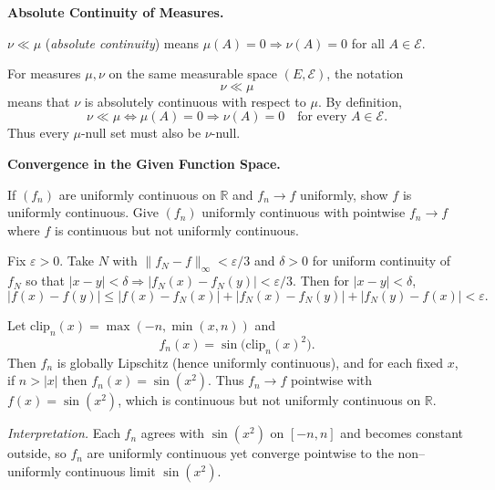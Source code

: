 \begin{problem}[CP-II-0558]
\label{prob:cp-ii-0558}
\textbf{Absolute Continuity of Measures.}

\hspace*{1.5em}$\nu\ll\mu$ (\emph{absolute continuity}) means $\mu(A)=0\Rightarrow \nu(A)=0$ for all $A\in\mathcal E$.
\end{problem}

\begin{solution}
For measures \(\mu,\nu\) on the same measurable space \((E,\mathcal E)\),
the notation
\[
\nu\ll\mu
\]
means that \(\nu\) is absolutely continuous with respect to \(\mu\). By definition,
\[
\boxed{
\nu\ll\mu
\iff
\mu(A)=0
\Longrightarrow
\nu(A)=0
\quad
\text{for every }A\in\mathcal E.
}
\]
Thus every \(\mu\)-null set must also be \(\nu\)-null.
\end{solution}


\begin{problem}[CP-II-0560]
\label{prob:cp-ii-0560}
\textbf{Convergence in the Given Function Space.}

\hspace*{1.5em}If $(f_n)$ are uniformly continuous on $\mathbb R$ and $f_n\to f$ uniformly, show $f$ is uniformly continuous.
Give $(f_n)$ uniformly continuous with pointwise $f_n\to f$ where $f$ is continuous but not uniformly continuous.

Fix $\varepsilon>0$. Take $N$ with $\|f_N-f\|_\infty<\varepsilon/3$ and $\delta>0$ for uniform continuity of $f_N$
so that $|x-y|<\delta\Rightarrow |f_N(x)-f_N(y)|<\varepsilon/3$.
Then for $|x-y|<\delta$,
\[
|f(x)-f(y)|\le |f(x)-f_N(x)|+|f_N(x)-f_N(y)|+|f_N(y)-f(x)|<\varepsilon.
\]

Let $\mathrm{clip}_n(x)=\max(-n,\min(x,n))$ and
\[
f_n(x)=\sin\!\big(\mathrm{clip}_n(x)^2\big).
\]
Then $f_n$ is globally Lipschitz (hence uniformly continuous), and for each fixed $x$, if $n>|x|$ then $f_n(x)=\sin(x^2)$.
Thus $f_n\to f$ pointwise with $f(x)=\sin(x^2)$, which is continuous but not uniformly continuous on $\mathbb R$.

\noindent
\textit{Interpretation.}
Each $f_n$ agrees with $\sin(x^2)$ on $[-n,n]$ and becomes constant outside, so $f_n$ are uniformly continuous
yet converge pointwise to the non--uniformly continuous limit $\sin(x^2)$.

\bigskip
\end{problem}

